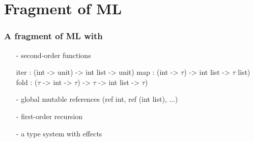 \documentclass[xcolor=dvipsnames]{beamer}
\begin{document}

\section*{Fragment of ML}
\begin{frame}[fragile]
\frametitle{A fragment of ML with}
 
\begin{itemize}
	\item[-] {\red second-order} functions  
	\begin{footnotesize}
	\begin{whycode}
      iter : (int -> unit) -> int list -> unit)
      map  : (int -> $\tau$) -> int list -> $\tau$ list)
      fold : ($\tau$ -> int -> $\tau$) -> $\tau$ -> int list -> $\tau$) \end{whycode}
	\end{footnotesize}	
	\item[-] global {\red mutable} references ({\blue ref} int, {\blue ref} (int list), ...) 
	\item[-] {\red first-order} recursion  
	\item[-] a type system {\red with effects}
\end{itemize}
\end{frame}
\end{document}
